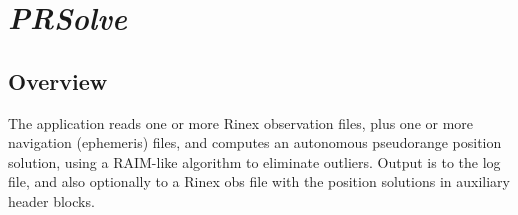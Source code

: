 %
%

\section{\emph{PRSolve}}
\subsection{Overview}
The application reads one or more Rinex observation files, plus one or more
   navigation (ephemeris) files, and computes an autonomous pseudorange
   position solution, using a RAIM-like algorithm to eliminate outliers.
   Output is to the log file, and also optionally to a Rinex obs file with
   the position solutions in auxiliary header blocks.

